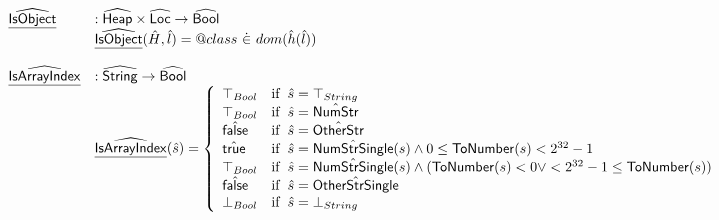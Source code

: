 \[
\begin{array}{ll}
\ahf{IsObject} & : \aHeap \times \aLoc \rightarrow \abs{Bool} \\
& \ahf{IsObject}(\hat{H},\hat{l}) = \varprop{class} ~ \dot{\in} ~ dom(\hat{h}(\hat{l})) \\
\\

\ahf{IsArrayIndex} & : \abs{String} \rightarrow \abs{Bool} \\
& \ahf{IsArrayIndex}(\hat{s}) = \left\{
      \begin{array}{ll}
        \top_{Bool} & \ifc{\hat{s} = \top_{String}}\\
        \top_{Bool} & \ifc{\hat{s} = \hat{\SF{NumStr}}}\\
        \afalse     & \ifc{\hat{s} = \hat{\SF{OtherStr}}}\\
        \atrue      & \ifc{\hat{s} = \hat{\SF{NumStrSingle}}(s) \land 0 \leq \SF{ToNumber}(s) < 2^{32}-1}\\
        \top_{Bool} & \ifc{\hat{s} = \hat{\SF{NumStrSingle}}(s) \land (\SF{ToNumber}(s) < 0 \lor < 2^{32}-1 \leq \SF{ToNumber}(s))}\\
        \afalse     & \ifc{\hat{s} = \hat{\SF{OtherStrSingle}}}\\
        \bot_{Bool} & \ifc{\hat{s} = \bot_{String}} \\
      \end{array}
    \right.\\
\\


\end{array}\]

